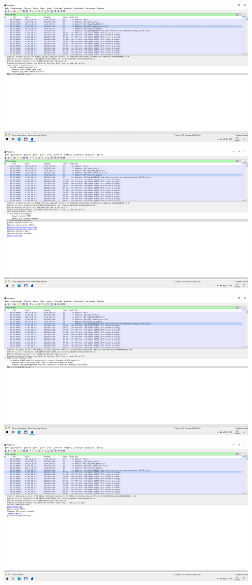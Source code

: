 \includegraphics[width=\textwidth]{screenshots/ftp_port_response_1}

\includegraphics[width=\textwidth]{screenshots/ftp_retr_request_1}

\includegraphics[width=\textwidth]{screenshots/ftp_retr_response_1}

\includegraphics[width=\textwidth]{screenshots/ftp_transfer_1}

